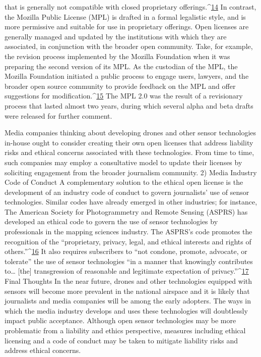 that is generally not compatible with closed proprietary offerings.^{\href{#endnotes-cooper}{14}} In contrast,
the Mozilla Public License (MPL) is drafted in a formal legalistic style,
and is more permissive and suitable for use in proprietary offerings.
Open licenses are generally managed and updated by the institutions with
which they are associated, in conjunction with the broader open community.
Take, for example, the revision process implemented by the Mozilla
Foundation when it was preparing the second version of its MPL. As the
custodian of the MPL, the Mozilla Foundation initiated a public process to
engage users, lawyers, and the broader open source community to provide
feedback on the MPL and offer suggestions for modification.^{\href{#endnotes-cooper}{15}} The MPL 2.0
was the result of a revisionary process that lasted almost two years, during
which several alpha and beta drafts were released for further comment.

Media companies thinking about developing drones and other sensor
technologies in-house ought to consider creating their own open licenses
that address liability risks and ethical concerns associated with these technologies.
From time to time, such companies may employ a consultative
model to update their licenses by soliciting engagement from the broader
journalism community.
2) Media Industry Code of Conduct
A complementary solution to the ethical open license is the development of
an industry code of conduct to govern journalists' use of sensor technologies.
Similar codes have already emerged in other industries; for instance,
The American Society for Photogrammetry and Remote Sensing (ASPRS)
has developed an ethical code to govern the use of sensor technologies by
professionals in the mapping sciences industry. The ASPRS's code promotes
the recognition of the ``proprietary, privacy, legal, and ethical interests and
rights of others.''^{\href{#endnotes-cooper}{16}} It also requires subscribers to ``not condone, promote,
advocate, or tolerate'' the use of sensor technologies ``in a manner that
knowingly contributes to… [the] transgression of reasonable and legitimate
expectation of privacy.''^{\href{#endnotes-cooper}{17}}
Final Thoughts
In the near future, drones and other technologies equipped with sensors
will become more prevalent in the national airspace and it is likely that journalists
and media companies will be among the early adopters. The ways in
which the media industry develops and uses these technologies will doubtlessly
impact public acceptance. Although open sensor technologies may be
more problematic from a liability and ethics perspective, measures including
ethical licensing and a code of conduct may be taken to mitigate liability
risks and address ethical concerns.

